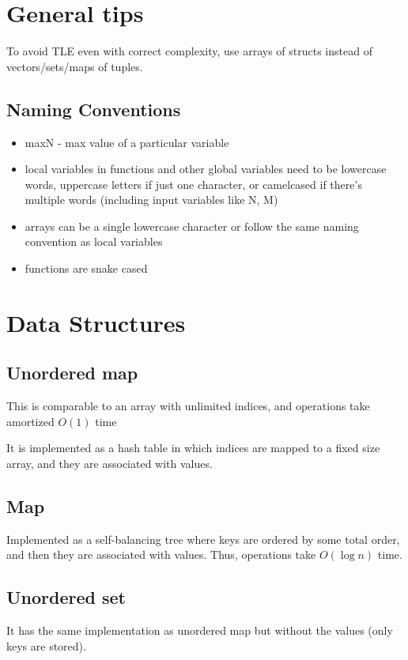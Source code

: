 \documentclass[12pt]{article}
\begin{document}
\section{General tips}
To avoid TLE even with correct complexity, use arrays of structs instead of vectors/sets/maps of tuples.

\subsection{Naming Conventions}
\begin{itemize}
    \item maxN - max value of a particular variable

    \item local variables in functions and other global variables
          need to be lowercase words, uppercase letters if just one character,
          or camelcased if there's multiple words (including input variables like N, M)

    \item arrays can be a single lowercase character or follow the same naming convention as local variables

    \item functions are snake cased
\end{itemize}

\section{Data Structures}

\subsection{Unordered map}
This is comparable to an array with unlimited indices, and operations take amortized $O(1)$ time

It is implemented as a hash table in which indices are mapped to a fixed size array, and they are
associated with values.

\subsection{Map}
Implemented as a self-balancing tree where keys are ordered by some total order, and then
they are associated with values. Thus, operations take $O(\log n)$ time.

\subsection{Unordered set}
It has the same implementation as unordered map but without the values (only keys are stored).
\end{document}
